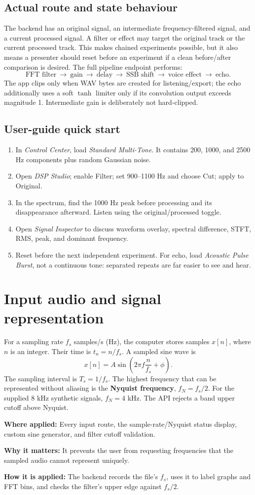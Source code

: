 \documentclass[11pt,a4paper]{article}
\newcommand{\applied}[3]{\begin{tcolorbox}[colback=white,colframe=black!28,boxrule=.3pt,arc=1mm,left=3mm,right=3mm,top=1.8mm,bottom=1.8mm]\small\textbf{Where applied:} #1\par\textbf{Why it matters:} #2\par\textbf{How it is applied:} #3\end{tcolorbox}}
\newcommand{\term}[1]{\textbf{#1}}
\begin{document}
\subsection{Actual route and state behaviour}
The backend has an original signal, an intermediate frequency-filtered signal, and a current processed signal. A filter or effect may target the original track or the current processed track. This makes chained experiments possible, but it also means a presenter should reset before an experiment if a clean before/after comparison is desired. The full pipeline endpoint performs:
\[
\boxed{\text{FFT filter}\ \longrightarrow\ \text{gain}\ \longrightarrow\ \text{delay}\ \longrightarrow\ \text{SSB shift}\ \longrightarrow\ \text{voice effect}\ \longrightarrow\ \text{echo}.}
\]
The app clips only when WAV bytes are created for listening/export; the echo additionally uses a soft \(\tanh\) limiter only if its convolution output exceeds magnitude 1. Intermediate gain is deliberately not hard-clipped.

\subsection{User-guide quick start}
\begin{enumerate}
\item In \emph{Control Center}, load \emph{Standard Multi-Tone}. It contains 200, 1000, and 2500 Hz components plus random Gaussian noise.
\item Open \emph{DSP Studio}; enable Filter; set 900--1100 Hz and choose Cut; apply to Original.
\item In the spectrum, find the 1000 Hz peak before processing and its disappearance afterward. Listen using the original/processed toggle.
\item Open \emph{Signal Inspector} to discuss waveform overlay, spectral difference, STFT, RMS, peak, and dominant frequency.
\item Reset before the next independent experiment. For echo, load \emph{Acoustic Pulse Burst}, not a continuous tone: separated repeats are far easier to see and hear.
\end{enumerate}

\section{Input audio and signal representation}
For a sampling rate \(f_s\) samples/s (Hz), the computer stores samples \(x[n]\), where \(n\) is an integer. Their time is \(t_n=n/f_s\). A sampled sine wave is
\[
x[n]=A\sin\left(2\pi f\frac{n}{f_s}+\phi\right).
\]
The sampling interval is \(T_s=1/f_s\). The highest frequency that can be represented without aliasing is the \term{Nyquist frequency}, \(f_N=f_s/2\). For the supplied 8 kHz synthetic signals, \(f_N=4\) kHz. The API rejects a band upper cutoff above Nyquist.
\applied{Every input route, the sample-rate/Nyquist status display, custom sine generator, and filter cutoff validation.}{It prevents the user from requesting frequencies that the sampled audio cannot represent uniquely.}{The backend records the file's \(f_s\), uses it to label graphs and FFT bins, and checks the filter's upper edge against \(f_s/2\).}
\end{document}
